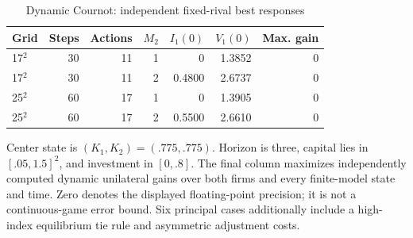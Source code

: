 \begin{table}[t]\centering
\caption{Dynamic Cournot: independent fixed-rival best responses}\label{tab:game-r6}
\small\begin{tabular}{lrrrrrr}
\toprule
Grid & Steps & Actions & $M_2$ & $I_1(0)$ & $V_1(0)$ & Max. gain\\\midrule
17$^2$ & 30 & 11 & 1 & 0 & 1.3852 & 0\\
17$^2$ & 30 & 11 & 2 & 0.4800 & 2.6737 & 0\\
25$^2$ & 60 & 17 & 1 & 0 & 1.3905 & 0\\
25$^2$ & 60 & 17 & 2 & 0.5500 & 2.6610 & 0\\
\bottomrule\end{tabular}
\par\smallskip\footnotesize Center state is $(K_1,K_2)=(.775,.775)$. Horizon is three, capital lies in $[.05,1.5]^2$, and investment in $[0,.8]$. The final column maximizes independently computed dynamic unilateral gains over both firms and every finite-model state and time. Zero denotes the displayed floating-point precision; it is not a continuous-game error bound. Six principal cases additionally include a high-index equilibrium tie rule and asymmetric adjustment costs.
\end{table}
